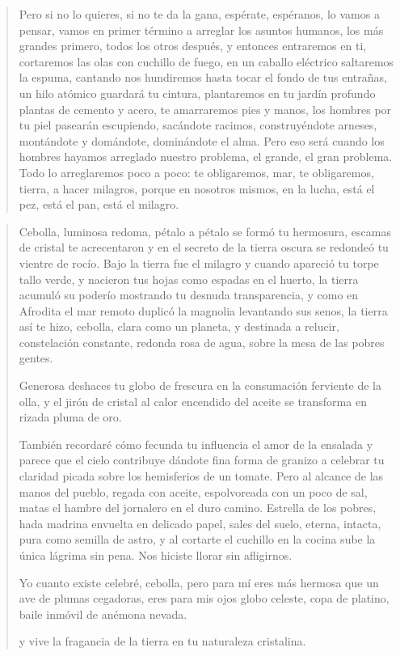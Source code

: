 \documentclass[12pt]{article}
\begin{document}
\begin{verse}
Pero  
si no lo quieres,  
si no te da la gana,  
espérate,  
espéranos,  
lo vamos a pensar,  
vamos en primer término  
a arreglar los asuntos  
humanos,  
los más grandes primero,  
todos los otros después,  
y entonces  
entraremos en ti,  
cortaremos las olas  
con cuchillo de fuego,  
en un caballo eléctrico  
saltaremos la espuma,  
cantando  
nos hundiremos  
hasta tocar el fondo  
de tus entrañas,  
un hilo atómico  
guardará tu cintura,  
plantaremos  
en tu jardín profundo  
plantas  
de cemento y acero,  
te amarraremos  
pies y manos,  
los hombres por tu piel  
pasearán escupiendo,  
sacándote racimos,  
construyéndote arneses,  
montándote y domándote,  
dominándote el alma.  
Pero eso será cuando  
los hombres  
hayamos arreglado  
nuestro problema,  
el grande,  
el gran problema.  
Todo lo arreglaremos  
poco a poco:  
te obligaremos, mar,  
te obligaremos, tierra,  
a hacer milagros,  
porque en nosotros mismos,  
en la lucha,  
está el pez, está el pan,  
está el milagro.  

\end{verse}

\clearpage
{}
\begin{verse}
Cebolla,  
luminosa redoma,  
pétalo a pétalo  
se formó tu hermosura,  
escamas de cristal te acrecentaron  
y en el secreto de la tierra oscura  
se redondeó tu vientre de rocío.  
Bajo la tierra  
fue el milagro  
y cuando apareció  
tu torpe tallo verde,  
y nacieron  
tus hojas como espadas en el huerto,  
la tierra acumuló su poderío  
mostrando tu desnuda transparencia,  
y como en Afrodita el mar remoto  
duplicó la magnolia  
levantando sus senos,  
la tierra  
así te hizo,  
cebolla,  
clara como un planeta,  
y destinada  
a relucir,  
constelación constante,  
redonda rosa de agua,  
sobre  
la mesa  
de las pobres gentes.  

Generosa  
deshaces  
tu globo de frescura  
en la consumación  
ferviente de la olla,  
y el jirón de cristal  
al calor encendido del aceite  
se transforma en rizada pluma de oro.  

También recordaré cómo fecunda  
tu influencia el amor de la ensalada  
y parece que el cielo contribuye  
dándote fina forma de granizo  
a celebrar tu claridad picada  
sobre los hemisferios de un tomate.  
Pero al alcance  
de las manos del pueblo,  
regada con aceite,  
espolvoreada  
con un poco de sal,  
matas el hambre  
del jornalero en el duro camino.  
Estrella de los pobres,  
hada madrina  
envuelta  
en delicado  
papel, sales del suelo,  
eterna, intacta, pura  
como semilla de astro,  
y al cortarte  
el cuchillo en la cocina  
sube la única lágrima  
sin pena.  
Nos hiciste llorar sin afligirnos.  

Yo cuanto existe celebré, cebolla,  
pero para mí eres  
más hermosa que un ave  
de plumas cegadoras,  
eres para mis ojos  
globo celeste, copa de platino,  
baile inmóvil  
de anémona nevada.  

y vive la fragancia de la tierra  
en tu naturaleza cristalina.  

\end{verse}
\end{document}
